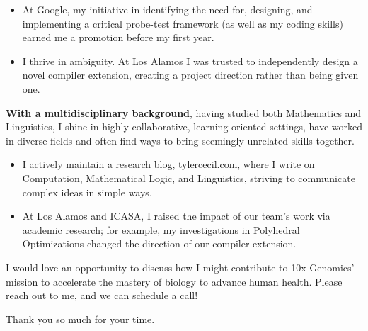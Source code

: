 \documentclass[sans, a4paper, 11pt]{article}
\newcommand{\cvcolor}[1]{{\color{MidnightBlue}#1}}
\renewcommand{\hl}[1]{\cvcolor{\textbf{#1}}}
\begin{document}
\begin{adjustwidth}{40pt}{40pt}
\begin{itemize}
  \begin{itemize}

    \item At Google, my initiative in identifying the need for, designing, and
      implementing a critical probe-test framework (as well as my coding
      skills) earned me a promotion before my first year.

    \item I thrive in ambiguity. At Los Alamos I was trusted to independently
      design a novel compiler extension, creating a project direction rather
      than being given one.


  \end{itemize}\smallskip


  \hl{With a multidisciplinary background}, having studied both Mathematics and
  Linguistics, I shine in highly-collaborative, learning-oriented settings,
  have worked in diverse fields and often find ways to bring seemingly
  unrelated skills together.\smallskip

  \begin{itemize}

    \item I actively maintain a research blog, \url{tylercecil.com}, where I
      write on Computation, Mathematical Logic, and Linguistics, striving to
      communicate complex ideas in simple ways.

    \item At Los Alamos and ICASA, I raised the impact of our team's work via
      academic research; for example, my investigations in Polyhedral
      Optimizations changed the direction of our compiler extension.

  \end{itemize} \medskip

  I would love an opportunity to discuss how I might contribute to 10x
  Genomics' mission to accelerate the mastery of biology to advance human
  health. Please reach out to me, and we can schedule a call!  \bigskip

  Thank you so much for your time.


\end{itemize}
\end{adjustwidth}
\end{document}
